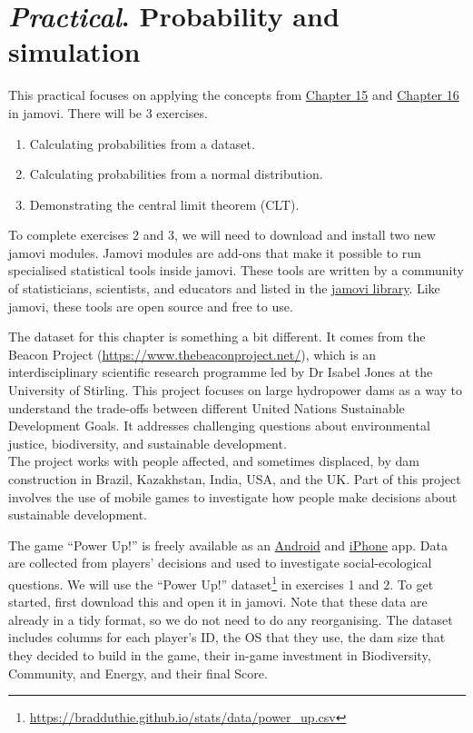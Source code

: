 \documentclass[
  openany]{scrbook}
\providecommand{\tightlist}{%
  \setlength{\itemsep}{0pt}\setlength{\parskip}{0pt}}
\begin{document}
\hypertarget{Chapter_17}{%
\chapter{\texorpdfstring{\emph{Practical}. Probability and simulation}{Practical. Probability and simulation}}\label{Chapter_17}}

This practical focuses on applying the concepts from \protect\hyperlink{Chapter_15}{Chapter 15} and \protect\hyperlink{Chapter_16}{Chapter 16} in jamovi.
There will be 3 exercises.

\begin{enumerate}
\def\labelenumi{\arabic{enumi}.}
\tightlist
\item
  Calculating probabilities from a dataset.
\item
  Calculating probabilities from a normal distribution.
\item
  Demonstrating the central limit theorem (CLT).
\end{enumerate}

To complete exercises 2 and 3, we will need to download and install two new jamovi modules.
Jamovi modules are add-ons that make it possible to run specialised statistical tools inside jamovi.
These tools are written by a community of statisticians, scientists, and educators and listed in the \href{https://www.jamovi.org/library.html}{jamovi library}.
Like jamovi, these tools are open source and free to use.

The dataset for this chapter is something a bit different.
It comes from the Beacon Project (\url{https://www.thebeaconproject.net/}), which is an interdisciplinary scientific research programme led by Dr Isabel Jones at the University of Stirling.
This project focuses on large hydropower dams as a way to understand the trade-offs between different United Nations Sustainable Development Goals.
It addresses challenging questions about environmental justice, biodiversity, and sustainable development.\\
The project works with people affected, and sometimes displaced, by dam construction in Brazil, Kazakhstan, India, USA, and the UK.
Part of this project involves the use of mobile games to investigate how people make decisions about sustainable development.

The game ``Power Up!'' is freely available as an \href{https://play.google.com/store/apps/details?id=com.hyperluminal.stirlinguniversity.sustainabledevelopmentgame}{Android} and \href{https://apps.apple.com/gb/app/power-up/id1585634888}{iPhone} app.
Data are collected from players' decisions and used to investigate social-ecological questions.
We will use the ``Power Up!'' dataset\footnote{\url{https://bradduthie.github.io/stats/data/power_up.csv}} in exercises 1 and 2.
To get started, first download this and open it in jamovi.
Note that these data are already in a tidy format, so we do not need to do any reorganising.
The dataset includes columns for each player's ID, the OS that they use, the dam size that they decided to build in the game, their in-game investment in Biodiversity, Community, and Energy, and their final Score.
\end{document}
